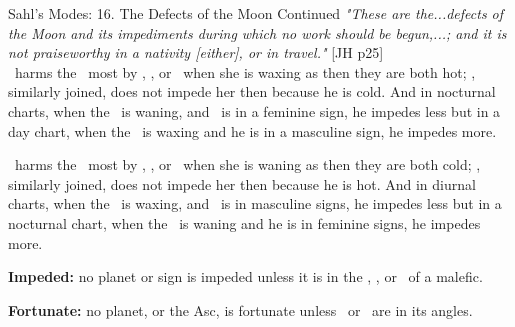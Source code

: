 \begin{frame}[t]{Sahl's Modes: 16. The Defects of the Moon Continued}
\textsl{"These are the...defects of the Moon and its impediments during which no work should be begun,...; and it is not praiseworthy in a nativity [either], or in travel."} [JH p25] \\ \vspace{0.25cm}
\Mars\ harms the \Moon\ most by \Conjunction, \Square, or \Opposition\ when she is waxing as then they are both hot; \Saturn, similarly joined, does not impede her then because he is cold. And in nocturnal charts, when the \Moon\ is waning, and \Mars\ is in a feminine sign, he impedes less but in a day chart, when the \Moon\ is waxing and he is in a masculine sign, he impedes more.

\Saturn\ harms the \Moon\ most by \Conjunction, \Square, or \Opposition\ when she is waning as then they are both cold; \Mars, similarly joined, does not impede her then because he is hot. And in diurnal charts, when the \Moon\ is waxing, and \Saturn\ is in masculine signs, he impedes less but in a nocturnal chart, when the \Moon\ is waning and he is in feminine signs, he impedes more.

\textbf{Impeded:} no planet or sign is impeded unless it is in the \Conjunction, \Square, or \Opposition\ of a malefic.

\textbf{Fortunate:} no planet, or the Asc, is fortunate unless \Venus\ or \Jupiter\ are in its angles.

\end{frame}
